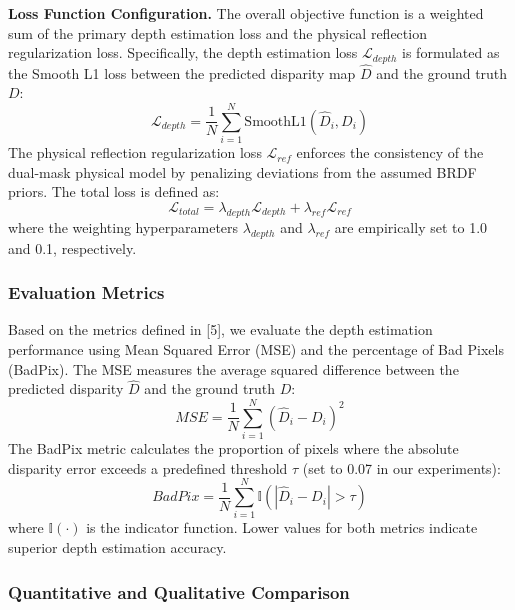 \textbf{Loss Function Configuration.} 
The overall objective function is a weighted sum of the primary depth estimation loss and the physical reflection regularization loss. Specifically, the depth estimation loss $\mathcal{L}_{depth}$ is formulated as the Smooth L1 loss between the predicted disparity map $\hat{D}$ and the ground truth $D$:
\begin{equation}
\label{eq:eq35}
\mathcal{L}_{depth} = \frac{1}{N} \sum_{i=1}^{N} \text{SmoothL1}(\hat{D}_i, D_i)
\end{equation}
The physical reflection regularization loss $\mathcal{L}_{ref}$ enforces the consistency of the dual-mask physical model by penalizing deviations from the assumed BRDF priors. The total loss is defined as:
\begin{equation}
\label{eq:eq36}
\mathcal{L}_{total} = \lambda_{depth} \mathcal{L}_{depth} + \lambda_{ref} \mathcal{L}_{ref}
\end{equation}
where the weighting hyperparameters $\lambda_{depth}$ and $\lambda_{ref}$ are empirically set to 1.0 and 0.1, respectively.

\subsubsection{Evaluation Metrics}

Based on the metrics defined in [5], we evaluate the depth estimation performance using Mean Squared Error (MSE) and the percentage of Bad Pixels (BadPix). The MSE measures the average squared difference between the predicted disparity $\hat{D}$ and the ground truth $D$:
\begin{equation}
\label{eq:eq37}
MSE = \frac{1}{N} \sum_{i=1}^{N} (\hat{D}_i - D_i)^2
\end{equation}
The BadPix metric calculates the proportion of pixels where the absolute disparity error exceeds a predefined threshold $\tau$ (set to 0.07 in our experiments):
\begin{equation}
\label{eq:eq38}
BadPix = \frac{1}{N} \sum_{i=1}^{N} \mathbb{I}(|\hat{D}_i - D_i| > \tau)
\end{equation}
where $\mathbb{I}(\cdot)$ is the indicator function. Lower values for both metrics indicate superior depth estimation accuracy.

\subsubsection{Quantitative and Qualitative Comparison}

